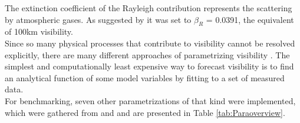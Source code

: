 The extinction coefficient of the Rayleigh contribution represents the scattering by atmospheric gases. As suggested by \citeauthor{clark2008prediction} \cite{clark2008prediction} it was set to $\beta_{R}$ = 0.0391, the equivalent of 100km visibility.\\
Since so many physical processes that contribute to visibility cannot be resolved explicitly, there are many different approaches of parametrizing visibility \cite{claxton2008using, clark2008prediction, smirnova2000case, stoelinga1999nonhydrostatic, gultepe2010probabilistic,gultepe2006, chmielecki2011probabilistic}.
The simplest and computationally least expensive way to forecast visibility is to find an analytical function of some model variables by fitting to a set of measured data.\\
For benchmarking, seven other parametrizations of that kind were implemented, which were gathered from  \citeauthor{gultepe2010probabilistic} \cite{gultepe2010probabilistic} and \citeauthor{ gultepe2006} \cite{ gultepe2006} and are presented in Table \ref{tab:Paraoverview}.


